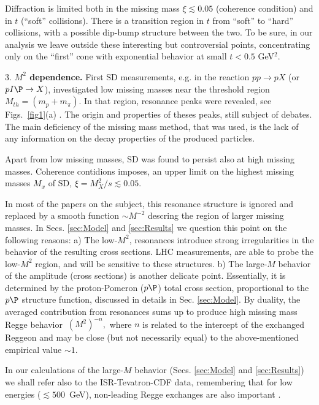 \documentclass[12pt]{article}
\begin{document}
Diffraction is limited both in the missing mass $\xi\lesssim 0.05$ (coherence condition) and in $t$ (``soft'' collisions). There is a transition region in $t$ from ``soft'' to ``hard'' collisions, with a possible dip-bump structure between the two. To be sure, in our analysis we leave outside these interesting but controversial points, concentrating only on the ``first'' cone with exponential behavior at small $t<0.5$ GeV$^2$.

3. {\bf $M^2$ dependence.} 
First SD measurements, e.g. in the reaction $pp\rightarrow pX$ (or $pI\P\rightarrow X$), investigated low missing masses near the threshold region $M_{th}=(m_p+m_{\pi})$. In that region, resonance peaks were revealed, see Figs.~\ref{fig1}(a) . The origin and properties of theses peaks, still subject of debates. The main deficiency of the missing mass method, that was used, is the lack of any information on the decay properties of the produced particles. 

Apart from low missing masses, SD was found to persist also at high missing masses. Coherence contidions imposes,  an upper limit on the highest missing masses $M_x$ of SD,  $\xi=M^2_X/s\lesssim0.05$.


In most of the papers on the subject, this resonance structure is ignored and replaced by a smooth function $\sim M^{-2}$ descring the region of larger missing masses. In Secs. \ref{sec:Model} and \ref{sec:Results} we question this point on the following reasons: a) The low-$M^2$, resonances introduce strong irregularities in the behavior of the resulting cross sections. LHC measurements, are able to probe the low-$M^2$ region, and will be sensitive to these structures. b) The large-$M$ behavior of the amplitude (cross sections) is another delicate point. Essentially, it is determined by the proton-Pomeron ($p\P$) total cross section, proportional to the $p\P$ structure function, discussed in details in Sec. \ref{sec:Model}.
By duality, the averaged contribution from resonances sums up to produce high missing mass Regge behavior $~(M^2)^{-n},$ where $n$ is related to the intercept of the exchanged Reggeon and may be close (but not necessarily equal) to the above-mentioned empirical value $\sim 1$.

In our calculations of the large-$M$ behavior (Secs. \ref{sec:Model} and \ref{sec:Results}) we shall refer also to the ISR-Tevatron-CDF data, remembering that for low energies ($\lesssim500$~GeV), non-leading Regge exchanges are also important \cite{JLL}.
\end{document}
